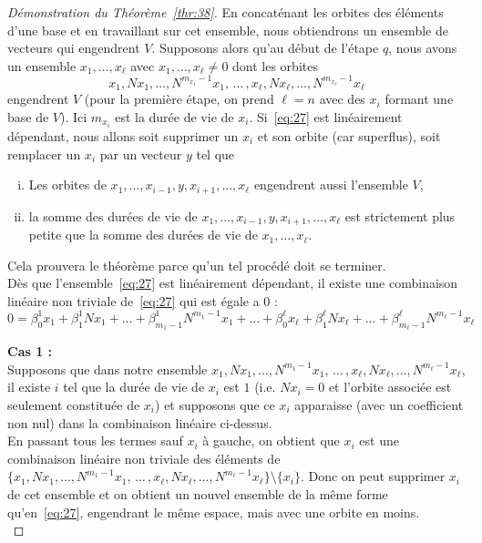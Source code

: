 \begin{proof}[Démonstration du Théorème~\ref{thr:38}] 
  En concaténant les orbites des éléments d'une base et en travaillant sur cet ensemble, nous obtiendrons un ensemble de vecteurs qui engendrent $V$. 
  Supposons alors qu'au début de l'étape $q$, nous avons un ensemble $x_1,\dots,x_\ell$ avec $x_1,\dots,x_\ell \neq0$  dont les orbites 
  \begin{equation}
    \label{eq:27}
    x_1,Nx_1,\dots,N^{m_{x_1}-1}x_1, \,\dots \, ,  x_\ell,Nx_\ell,\dots,N^{m_{x_\ell}-1}x_\ell
  \end{equation}
  engendrent $V$ (pour la première étape, on prend $\ell = n$ avec des $x_i$ formant une base de $V$). Ici $m_{x_i}$ est la durée de vie de $x_i$. Si~\eqref{eq:27} est linéairement dépendant, nous allons soit supprimer un $x_i$ et son orbite (car superflus), soit remplacer un $x_i$ par un vecteur $y$ tel que 
  \begin{enumerate}[i)]
  \item Les orbites de $x_1,\dots, x_{i-1},y,x_{i+1},\dots,x_{\ell}$ engendrent aussi l'ensemble  $V$, 
  \item la somme des durées de vie de $x_1,\dots, x_{i-1},y,x_{i+1},\dots,x_{\ell}$  est strictement plus petite que la somme des durées de vie de $x_1,\dots,x_{\ell}$. 
  \end{enumerate}
Cela prouvera le théorème parce qu'un tel procédé doit se terminer. \\

Dès que l'ensemble~\eqref{eq:27} est linéairement dépendant, il existe une combinaison linéaire non triviale de~\eqref{eq:27} qui est égale a $0$ :
\begin{displaymath}
0 =   β_0^1 x_1 + β_1^1 Nx_1+ \dots+ β_{m_1-1}^1 N^{m_1-1}x_1 + \dots + 
β_0^\ell x_\ell + β_1^\ell Nx_\ell+ \dots+ β_{m_\ell-1}^\ell N^{m_\ell-1}x_\ell 
\end{displaymath}

\textbf{Cas 1 :} \\
Supposons que dans notre ensemble $x_1,Nx_1,\dots,N^{m_1-1}x_1, \,\dots \, ,  x_\ell,Nx_\ell,\dots,N^{m_\ell-1}x_\ell$, il existe $i$ tel que la durée de vie de $x_i$ est $1$ (i.e. $Nx_i = 0$ et l'orbite associée est seulement constituée de $x_i$) et supposons que ce $x_i$ apparaisse (avec un coefficient non nul) dans la combinaison linéaire ci-dessus. \\
En passant tous les termes sauf $x_i$ à gauche, on obtient  que $x_i$ est une combinaison linéaire non triviale des éléments de $\{ x_1,Nx_1,\dots,N^{m_1-1}x_1, \,\dots \, ,  x_\ell,Nx_\ell,\dots,N^{m_\ell-1}x_\ell \} \setminus \{x_i\}$. Donc on peut supprimer $x_i$ de cet ensemble et on obtient un nouvel ensemble de la même forme qu'en~\eqref{eq:27}, engendrant le même espace, mais avec une orbite en moins. \\


\end{proof}
